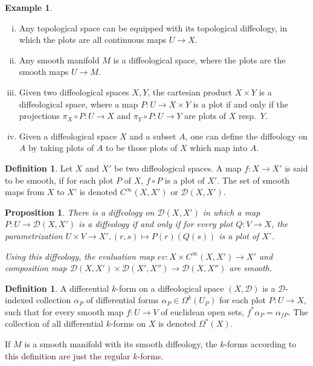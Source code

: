 \documentclass{scrartcl}
\theoremstyle{plain}
\newtheorem{proposition}[theorem]{Proposition}
\theoremstyle{definition}
\newtheorem{definition}[theorem]{Definition}
\newtheorem{example}[theorem]{Example}
\newcommand{\comp}{\mathbin{\circ}}
\begin{document}
\begin{example}\begin{enumerate}[(i)]
    \item Any topological space can be equipped with its topological diffeology, in which the plots are all continuous maps $U\to X$.
    \item Any smooth manifold $M$ is a diffeological space, where the plots are the smooth maps $U\to M$.
    \item Given two diffeological spaces $X, Y$, the cartesian product $X\times Y$ is a diffeological space, where a map $P\colon U\to X\times Y$ is a plot if and only if the projections $\pi_X \comp P \colon U\to X$ and $\pi_Y\comp P\colon U\to Y$ are plots of $X$ resp.\ $Y$.
    \item Given a diffeological space $X$ and a subset $A$, one can define the diffeology on $A$ by taking plots of $A$ to be those plots of $X$ which map into $A$.
\end{enumerate}\end{example}
\begin{definition}
    Let $X$ and $X'$ be two diffeological spaces. A map $f\colon X\to X'$ is said to be smooth, if for each plot $P$ of $X$, $f\comp P$ is a plot of $X'$. The set of smooth maps from $X$ to $X'$ is denoted $C^\infty(X, X')$ or $\mathcal D(X, X')$.
\end{definition}
\begin{proposition}
    There is a diffeology on $\mathcal D(X, X')$ in which a map $P\colon U\to \mathcal D(X, X')$ is a diffeology if and only if for every plot $Q\colon V\to X$, the parametrization $U\times V\to X', (r,s)\mapsto P(r)(Q(s))$ is a plot of $X'$. 
    
    Using this diffeology, the evaluation map $ev\colon X\times C^\infty(X, X') \to X'$ and composition map $\mathcal D(X, X')\times \mathcal D(X', X'')\to \mathcal D(X, X'')$ are smooth.
\end{proposition}

\begin{definition}
    A differential $k$-form on a diffeological space $(X,\mathcal D)$ is a $\mathcal D$-indexed collection $\alpha_P$ of differential forms $\alpha_P\in \Omega^k(U_P)$ for each plot $P\colon U\to X$, such that for every smooth map $f\colon U\to V$ of euclidean open sets, $f^*\alpha_P = \alpha_{fP}$. The collection of all differential $k$-forms on $X$ is denoted $\Omega^*(X)$.
\end{definition}
If $M$ is a smooth manifold with its smooth diffeology, the $k$-forms according to this definition are just the regular $k$-forms. 
\end{document}
